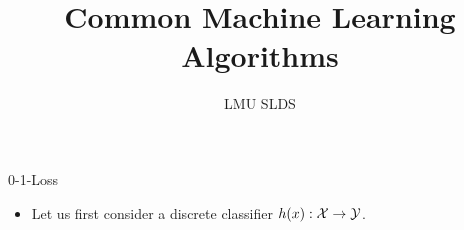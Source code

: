 



\newcommand{\titlefigure}{figure/bagging.pdf}

\title{Common Machine Learning Algorithms}
\author{LMU SLDS}
\date{}



\lecturechapter{}

\begin{vbframe}{0-1-Loss}

\begin{itemize}
  \item Let us first consider a discrete classifier $h(x): \mathcal{X} \to \mathcal{Y}$. 
\end{itemize}

\end{vbframe}

\endlecture

